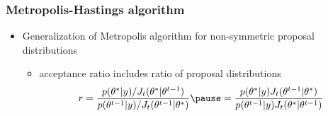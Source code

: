 \documentclass[10pt,handout]{beamer}
\begin{document}
\begin{frame}

\frametitle{ Metropolis-Hastings algorithm}

  \begin{itemize}
  \item Generalization of Metropolis algorithm for non-symmetric proposal distributions
    \begin{itemize}
    \item acceptance ratio includes ratio of proposal distributions
      \begin{equation*}
        r =
        \frac{p(\theta^{*}|y)/J_t(\theta^{*}|\theta^{t-1})}{p(\theta^{t-1}|y)/J_t(\theta^{t-1}|\theta^{*})} \pause =
        \frac{p(\theta^{*}|y)J_t(\theta^{t-1}|\theta^{*})}{p(\theta^{t-1}|y)J_t(\theta^{*}|\theta^{t-1})}
      \end{equation*}
    \end{itemize}
  \end{itemize}

\end{frame}




\end{document}
